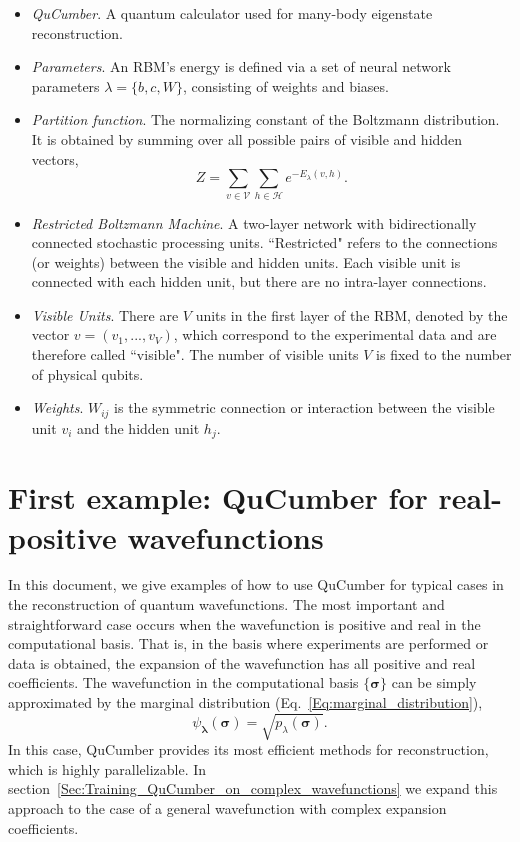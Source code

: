 \documentclass[submission, Phys]{SciPost}
\begin{document}
\begin{itemize}
\item {\it QuCumber}. A quantum calculator used for many-body eigenstate reconstruction.

\item {\it Parameters}.  An RBM's energy is defined via a set of neural network parameters $\lambda = \{b,c,W\}$, consisting of weights and biases.

\item {\it Partition function}. The normalizing constant of the Boltzmann distribution.  It is obtained by summing over all possible pairs of visible and hidden vectors,
\begin{equation}
    Z = \sum\limits_{v\in \mathcal{V}}\sum\limits_{h\in \mathcal{H}} e^{-E_{\lambda}(v,h)}.
\end{equation}

\item {\it Restricted Boltzmann Machine}.  A two-layer network with bidirectionally connected stochastic processing units.  ``Restricted" refers to the connections (or weights) between the visible and hidden units. Each visible unit is connected with each hidden unit, but there are no intra-layer connections.

\item {\it Visible Units}.  There are $V$ units in the first layer of the RBM, denoted by the vector $v=(v_1, ..., v_V)$, which correspond to the experimental data and are therefore called ``visible".  The number of visible units $V$ is fixed to the number of physical qubits.

\item {\it Weights}.  $W_{ij}$ is the symmetric connection or interaction between the visible unit $v_i$ and the hidden unit $h_j$.

\end{itemize}



\section{First example: QuCumber for real-positive wavefunctions}

In this document, we give examples of how to use QuCumber for typical cases in the reconstruction of quantum wavefunctions.  
The most important and straightforward case occurs when the wavefunction is positive and real in the computational basis.  That is, in the basis where experiments are performed or data is obtained, the expansion of the wavefunction has all positive and real coefficients.  The wavefunction in the computational basis $\{ \bm{\sigma} \}$ can be simply approximated by the marginal distribution (Eq.~\ref{Eq:marginal_distribution}), 
\begin{equation}
\psi_{\bm{\lambda}}(\bm{\sigma}) = \sqrt{p_{\lambda} ( \bm{\sigma})}.  \label{PDwavef}
\end{equation}
In this case, QuCumber provides its most efficient methods for reconstruction, which is highly parallelizable.  In section~\ref{Sec:Training_QuCumber_on_complex_wavefunctions} we expand this approach to the case of a general wavefunction with complex expansion coefficients.
\end{document}

